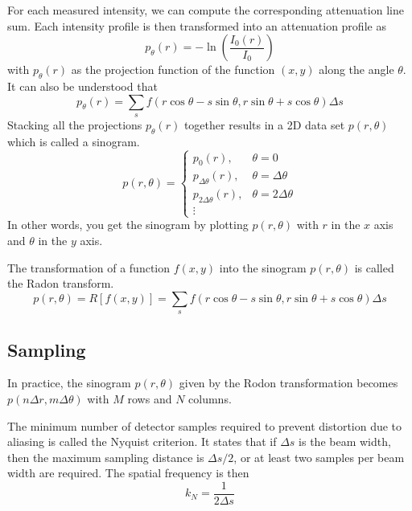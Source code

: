 \documentclass[../../../main.tex]{subfiles}
\begin{document}
For each measured intensity, we can compute the corresponding attenuation line sum.
Each intensity profile is then transformed into an attenuation profile as
\begin{equation*}
    p_\theta(r)=-\ln \left(  \frac{I_0(r )}{I_0}\right)
\end{equation*}
with $p_\theta(r)$ as the projection function of the function $(x,y)$ along the angle $\theta$.
It can also be understood that
\begin{equation*}
    p_\theta(r)=\sum_s f \left( r \cos \theta-s \sin \theta,r \sin \theta+s \cos \theta \right) \Delta s
\end{equation*}
Stacking all the projections $p_\theta(r)$ together results in a 2D data set $p(r,\theta)$ which is called a sinogram.
\begin{equation*}
    p(r,\theta)=\begin{cases}
        p_0(r),               & \theta=0             \\
        p_{\Delta\theta}(r),  & \theta=\Delta\theta  \\
        p_{2\Delta\theta}(r), & \theta=2\Delta\theta \\
        \vdots
    \end{cases}
\end{equation*}
In other words, you get the sinogram by plotting $p(r,\theta)$ with $r$ in the $x$ axis and $\theta$ in the $y$ axis.

The transformation of a function $f(x,y)$ into the sinogram $p(r,\theta)$ is called the Radon transform.
\begin{equation*}
    p(r,\theta)=R \left[ f(x,y) \right]=\sum_s f \left( r \cos \theta-s \sin \theta,r \sin \theta+s \cos \theta \right) \Delta s
\end{equation*}

\subsection{Sampling}
In practice, the sinogram $p(r,\theta)$ given by the Rodon transformation becomes $p(n\Delta  r,m\Delta\theta)$ with $M$ rows and $N$ columns.

The minimum number of detector samples required to prevent distortion due to aliasing is called the Nyquist criterion.
It states that if $\Delta s$ is the beam width, then the maximum sampling distance is $\Delta s/2$, or at least two samples per beam width are required.
The spatial frequency is then
\begin{equation*}
    k_N = \frac{1 }{2\Delta s}
\end{equation*}
\end{document}
